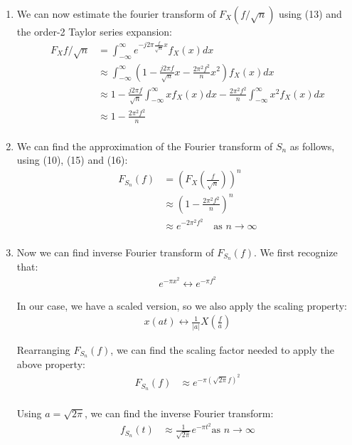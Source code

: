 \documentclass{article}
\begin{document}
\begin{enumerate}[label=1.\arabic*]
    \item We can now estimate the fourier transform of $F_X(f/\sqrt{n})$ using (13) and the order-2 Taylor series expansion:
    \begin{align*}
        F_X{f/\sqrt{n}} &= \int_{-\infty}^{\infty} e^{-j2\pi \frac{f}{\sqrt{n}}x} f_X(x) dx \\
        &\approx \int_{-\infty}^{\infty} \left(1 - \frac{j2\pi f}{\sqrt{n}}x - \frac{2\pi^2 f^2}{n}x^2\right) f_X(x) dx \\
        &\approx 1 - \frac{j2\pi f}{\sqrt{n}} \int_{-\infty}^{\infty} x f_X(x) dx - \frac{2\pi^2 f^2}{n} \int_{-\infty}^{\infty} x^2 f_X(x) dx \\
        &\approx 1 - \frac{2\pi^2 f^2}{n} \\
    \end{align*}

    \item We can find the approximation of the Fourier transform of $S_n$ as follows, using (10), (15) and (16):
    \begin{align*}
        F_{S_n}(f) &= \left(F_X\left(\frac{f}{\sqrt{n}}\right)\right)^n \\
        &\approx \left(1 - \frac{2\pi^2 f^2}{n}\right)^n \\
        &\approx e^{-2\pi^2 f^2} \quad \text{as } n \longrightarrow \infty \\
    \end{align*}

    \item Now we can find inverse Fourier transform of $F_{S_n}(f)$. We first recognize that:  
    \begin{align*}
        e^{-\pi x^2} \leftrightarrow e^{-\pi f^2}
    \end{align*}

    In our case, we have a scaled version, so we also apply the scaling property:
    \begin{align*}
        x(at) \leftrightarrow \frac{1}{|a|}X\left(\frac{f}{a}\right)
    \end{align*}

    Rearranging $F_{S_n}(f)$, we can find the scaling factor needed to apply the above property:
    \begin{align*}
        F_{S_n}(f) &\approx e^{-\pi (\sqrt{2\pi}f)^2} \\
    \end{align*}

    Using $a = \sqrt{2\pi}$, we can find the inverse Fourier transform:
    \begin{align*}
        f_{S_n}(t) &\approx \frac{1}{\sqrt{2\pi}} e^{-\pi t^2} \text{as } n \longrightarrow \infty \\
    \end{align*}
\end{enumerate}
\end{document}
